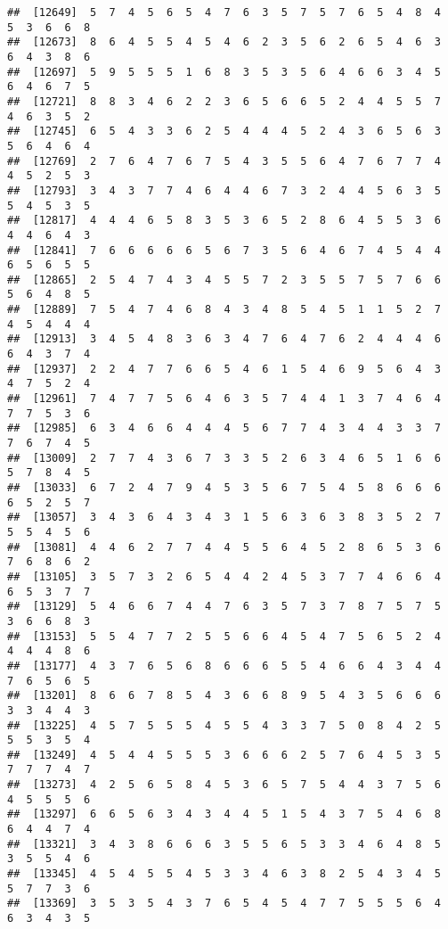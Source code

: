\documentclass[
]{book}
\begin{document}
\begin{verbatim}
##  [12649]  5  7  4  5  6  5  4  7  6  3  5  7  5  7  6  5  4  8  4  5  3  6  6  8
##  [12673]  8  6  4  5  5  4  5  4  6  2  3  5  6  2  6  5  4  6  3  6  4  3  8  6
##  [12697]  5  9  5  5  5  1  6  8  3  5  3  5  6  4  6  6  3  4  5  6  4  6  7  5
##  [12721]  8  8  3  4  6  2  2  3  6  5  6  6  5  2  4  4  5  5  7  4  6  3  5  2
##  [12745]  6  5  4  3  3  6  2  5  4  4  4  5  2  4  3  6  5  6  3  5  6  4  6  4
##  [12769]  2  7  6  4  7  6  7  5  4  3  5  5  6  4  7  6  7  7  4  4  5  2  5  3
##  [12793]  3  4  3  7  7  4  6  4  4  6  7  3  2  4  4  5  6  3  5  5  4  5  3  5
##  [12817]  4  4  4  6  5  8  3  5  3  6  5  2  8  6  4  5  5  3  6  4  4  6  4  3
##  [12841]  7  6  6  6  6  6  5  6  7  3  5  6  4  6  7  4  5  4  4  6  5  6  5  5
##  [12865]  2  5  4  7  4  3  4  5  5  7  2  3  5  5  7  5  7  6  6  5  6  4  8  5
##  [12889]  7  5  4  7  4  6  8  4  3  4  8  5  4  5  1  1  5  2  7  4  5  4  4  4
##  [12913]  3  4  5  4  8  3  6  3  4  7  6  4  7  6  2  4  4  4  6  6  4  3  7  4
##  [12937]  2  2  4  7  7  6  6  5  4  6  1  5  4  6  9  5  6  4  3  4  7  5  2  4
##  [12961]  7  4  7  7  5  6  4  6  3  5  7  4  4  1  3  7  4  6  4  7  7  5  3  6
##  [12985]  6  3  4  6  6  4  4  4  5  6  7  7  4  3  4  4  3  3  7  7  6  7  4  5
##  [13009]  2  7  7  4  3  6  7  3  3  5  2  6  3  4  6  5  1  6  6  5  7  8  4  5
##  [13033]  6  7  2  4  7  9  4  5  3  5  6  7  5  4  5  8  6  6  6  6  5  2  5  7
##  [13057]  3  4  3  6  4  3  4  3  1  5  6  3  6  3  8  3  5  2  7  5  5  4  5  6
##  [13081]  4  4  6  2  7  7  4  4  5  5  6  4  5  2  8  6  5  3  6  7  6  8  6  2
##  [13105]  3  5  7  3  2  6  5  4  4  2  4  5  3  7  7  4  6  6  4  6  5  3  7  7
##  [13129]  5  4  6  6  7  4  4  7  6  3  5  7  3  7  8  7  5  7  5  3  6  6  8  3
##  [13153]  5  5  4  7  7  2  5  5  6  6  4  5  4  7  5  6  5  2  4  4  4  4  8  6
##  [13177]  4  3  7  6  5  6  8  6  6  6  5  5  4  6  6  4  3  4  4  7  6  5  6  5
##  [13201]  8  6  6  7  8  5  4  3  6  6  8  9  5  4  3  5  6  6  6  3  3  4  4  3
##  [13225]  4  5  7  5  5  5  4  5  5  4  3  3  7  5  0  8  4  2  5  5  5  3  5  4
##  [13249]  4  5  4  4  5  5  5  3  6  6  6  2  5  7  6  4  5  3  5  7  7  7  4  7
##  [13273]  4  2  5  6  5  8  4  5  3  6  5  7  5  4  4  3  7  5  6  4  5  5  5  6
##  [13297]  6  6  5  6  3  4  3  4  4  5  1  5  4  3  7  5  4  6  8  6  4  4  7  4
##  [13321]  3  4  3  8  6  6  6  3  5  5  6  5  3  3  4  6  4  8  5  3  5  5  4  6
##  [13345]  4  5  4  5  5  4  5  3  3  4  6  3  8  2  5  4  3  4  5  5  7  7  3  6
##  [13369]  3  5  3  5  4  3  7  6  5  4  5  4  7  7  5  5  5  6  4  6  3  4  3  5

\end{verbatim}
\end{document}
